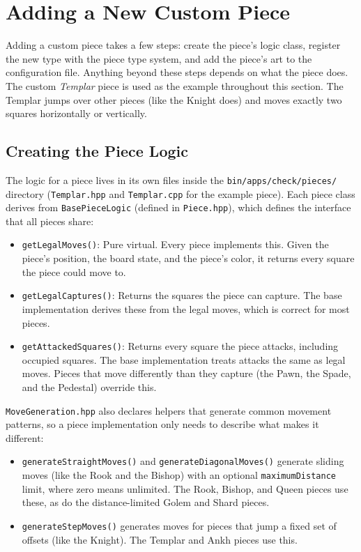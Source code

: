 \section{Adding a New Custom Piece}\label{section:check_adding_piece}

Adding a custom piece takes a few steps: create the piece's logic class, register the new type with the piece type system, and add the piece's art to the configuration file. Anything beyond these steps depends on what the piece does. The custom \textit{Templar} piece is used as the example throughout this section. The Templar jumps over other pieces (like the Knight does) and moves exactly two squares horizontally or vertically.


\subsection{Creating the Piece Logic}\label{section:check_creating_piece_logic}

The logic for a piece lives in its own files inside the \texttt{bin/apps/check/pieces/} directory (\texttt{Templar.hpp} and \texttt{Templar.cpp} for the example piece). Each piece class derives from \texttt{BasePieceLogic} (defined in \texttt{Piece.hpp}), which defines the interface that all pieces share:
\begin{itemize}\itemsep0em
	\item \texttt{getLegalMoves()}: Pure virtual. Every piece implements this. Given the piece's position, the board state, and the piece's color, it returns every square the piece could move to.
	\item \texttt{getLegalCaptures()}: Returns the squares the piece can capture. The base implementation derives these from the legal moves, which is correct for most pieces.
	\item \texttt{getAttackedSquares()}: Returns every square the piece attacks, including occupied squares. The base implementation treats attacks the same as legal moves. Pieces that move differently than they capture (the Pawn, the Spade, and the Pedestal) override this.
\end{itemize}

\texttt{MoveGeneration.hpp} also declares helpers that generate common movement patterns, so a piece implementation only needs to describe what makes it different:
\begin{itemize}\itemsep0em
	\item \texttt{generateStraightMoves()} and \texttt{generateDiagonalMoves()} generate sliding moves (like the Rook and the Bishop) with an optional \texttt{maximumDistance} limit, where zero means unlimited. The Rook, Bishop, and Queen pieces use these, as do the distance-limited Golem and Shard pieces.
	\item \texttt{generateStepMoves()} generates moves for pieces that jump a fixed set of offsets (like the Knight). The Templar and Ankh pieces use this.
\end{itemize}

